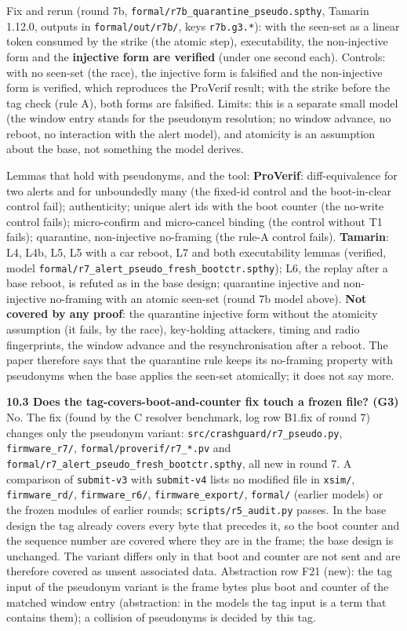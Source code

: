 Fix and rerun (round 7b, \texttt{formal/r7b\_quarantine\_pseudo.spthy}, Tamarin 1.12.0, outputs in \texttt{formal/out/r7b/}, keys \texttt{r7b.g3.*}): with the seen-set as a linear token consumed by the strike (the atomic step), executability, the non-injective form and the \textbf{injective form are verified} (under one second each). Controls: with no seen-set (the race), the injective form is falsified and the non-injective form is verified, which reproduces the ProVerif result; with the strike before the tag check (rule A), both forms are falsified. Limits: this is a separate small model (the window entry stands for the pseudonym resolution; no window advance, no reboot, no interaction with the alert model), and atomicity is an assumption about the base, not something the model derives.

Lemmas that hold with pseudonyms, and the tool: \textbf{ProVerif}: diff-equivalence for two alerts and for unboundedly many (the fixed-id control and the boot-in-clear control fail); authenticity; unique alert ids with the boot counter (the no-write control fails); micro-confirm and micro-cancel binding (the control without T1 fails); quarantine, non-injective no-framing (the rule-A control fails). \textbf{Tamarin}: L4, L4b, L5, L5 with a car reboot, L7 and both executability lemmas (verified, model \texttt{formal/r7\_alert\_pseudo\_fresh\_bootctr.spthy}); L6, the replay after a base reboot, is refuted as in the base design; quarantine injective and non-injective no-framing with an atomic seen-set (round 7b model above). \textbf{Not covered by any proof}: the quarantine injective form without the atomicity assumption (it fails, by the race), key-holding attackers, timing and radio fingerprints, the window advance and the resynchronisation after a reboot. The paper therefore says that the quarantine rule keeps its no-framing property with pseudonyms when the base applies the seen-set atomically; it does not say more.

\textbf{10.3 Does the tag-covers-boot-and-counter fix touch a frozen file? (G3)} No. The fix (found by the C resolver benchmark, log row B1.fix of round 7) changes only the pseudonym variant: \texttt{src/crashguard/r7\_pseudo.py}, \texttt{firmware\_r7/}, \texttt{formal/proverif/r7\_*.pv} and \texttt{formal/r7\_alert\_pseudo\_fresh\_bootctr.spthy}, all new in round 7. A comparison of \texttt{submit-v3} with \texttt{submit-v4} lists no modified file in \texttt{xsim/}, \texttt{firmware\_rd/}, \texttt{firmware\_r6/}, \texttt{firmware\_export/}, \texttt{formal/} (earlier models) or the frozen modules of earlier rounds; \texttt{scripts/r5\_audit.py} passes. In the base design the tag already covers every byte that precedes it, so the boot counter and the sequence number are covered where they are in the frame; the base design is unchanged. The variant differs only in that boot and counter are not sent and are therefore covered as unsent associated data. Abstraction row F21 (new): the tag input of the pseudonym variant is the frame bytes plus boot and counter of the matched window entry (abstraction: in the models the tag input is a term that contains them); a collision of pseudonyms is decided by this tag.



